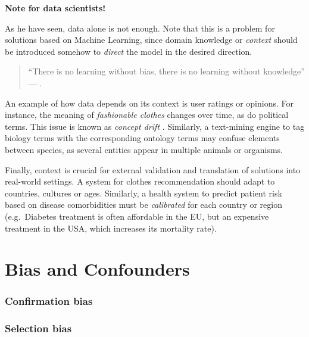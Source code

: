 \documentclass[
]{book}
\begin{document}
\begin{tipbox}

\textbf{Note for data scientists!}

As he have seen, data alone is not enough. Note that this is a problem for solutions based on Machine Learning, since domain knowledge or \emph{context} should be introduced somehow to \emph{direct} the model in the desired direction.

\begin{quote}
``There is no learning without bias, there is no learning without knowledge'' --- \citep{skansi2020guide} \citep{domingos2015master}.
\end{quote}

An example of how data depends on its context is user ratings or opinions. For instance, the meaning of \emph{fashionable clothes} changes over time, as do political terms. This issue is known as \emph{concept drift} \citep{kubat2017introduction}. Similarly, a text-mining engine to tag biology terms with the corresponding ontology terms may confuse elements between species, as several entities appear in multiple animals or organisms.

Finally, context is crucial for external validation and translation of solutions into real-world settings. A system for clothes recommendation should adapt to countries, cultures or ages. Similarly, a health system to predict patient risk based on disease comorbidities must be \emph{calibrated} for each country or region (e.g.~Diabetes treatment is often affordable in the EU, but an expensive treatment in the USA, which increases its mortality rate).

\end{tipbox}

\hypertarget{bias-and-confounders}{%
\section{Bias and Confounders}\label{bias-and-confounders}}

\hypertarget{confirmation-bias}{%
\subsubsection{Confirmation bias}\label{confirmation-bias}}

\hypertarget{selection-bias}{%
\subsubsection{Selection bias}\label{selection-bias}}
\end{document}
